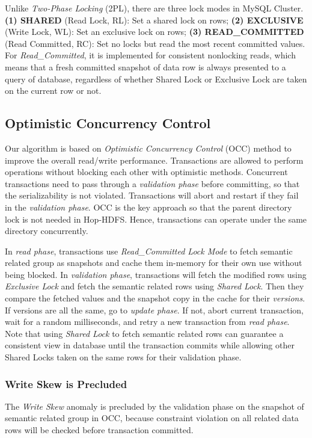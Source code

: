 \documentclass[runningheads,a4paper]{llncs}
\begin{document}
Unlike \textit{Two-Phase Locking} (2PL), there are three lock modes in MySQL Cluster. \textbf{(1) SHARED} (Read Lock, RL): Set a shared lock on rows; \textbf{(2) EXCLUSIVE} (Write Lock, WL): Set an exclusive lock on rows; \textbf{(3) READ\_COMMITTED} (Read Committed, RC): Set no locks but read the most recent committed values. For \textit{Read\_Committed}, it is implemented for consistent nonlocking reads, which means that a fresh committed snapshot of data row is always presented to a query of database, regardless of whether Shared Lock or Exclusive Lock are taken on the current row or not.

\subsection{Optimistic Concurrency Control}

Our algorithm is based on \textit{Optimistic Concurrency Control} (OCC) method to improve the overall read/write performance. Transactions are allowed to perform operations without blocking each other with optimistic methods. Concurrent transactions need to pass through a \textit{validation phase} before committing, so that the serializability is not violated. Transactions will abort and restart if they fail in the \textit{validation phase}. OCC is the key approach so that the parent directory lock is not needed in Hop-HDFS. Hence, transactions can operate under the same directory concurrently.

In \textit{read phase}, transactions use \textit{Read\_Committed Lock Mode} to fetch semantic related group as snapshots and cache them in-memory for their own use without being blocked. In \textit{validation phase}, transactions will fetch the modified rows using \textit{Exclusive Lock} and fetch the semantic related rows using \textit{Shared Lock}. Then they compare the fetched values and the snapshot copy in the cache for their \textit{versions}. If versions are all the same, go to \textit{update phase}. If not, abort current transaction, wait for a random milliseconds, and retry a new transaction from \textit{read phase}. Note that using \textit{Shared Lock} to fetch semantic related rows can guarantee a consistent view in database until the transaction commits while allowing other Shared Locks taken on the same rows for their validation phase.

\subsubsection{Write Skew is Precluded} The \textit{Write Skew} anomaly is precluded by the validation phase on the snapshot of semantic related group in OCC, because constraint violation on all related data rows will be checked before transaction committed.
\end{document}
